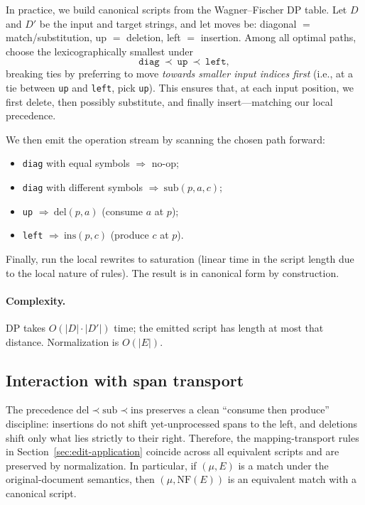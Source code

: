 \documentclass{article}
\begin{document}
In practice, we build canonical scripts from the Wagner–Fischer DP table.
Let $D$ and $D'$ be the input and target strings, and let moves be:
diagonal $=$ match/substitution, up $=$ deletion, left $=$ insertion.
Among all optimal paths, choose the lexicographically smallest under
\[
\texttt{diag} \ \prec\ \texttt{up} \ \prec\ \texttt{left},
\]
breaking ties by preferring to move \emph{towards smaller input indices first}
(i.e., at a tie between \texttt{up} and \texttt{left}, pick \texttt{up}).
This ensures that, at each input position, we first delete, then possibly substitute,
and finally insert---matching our local precedence.

We then emit the operation stream by scanning the chosen path forward:
\begin{itemize}
	\item \texttt{diag} with equal symbols $\Rightarrow$ no-op;
	\item \texttt{diag} with different symbols $\Rightarrow\ \mathrm{sub}(p,a,c)$;
	\item \texttt{up} $\Rightarrow\ \mathrm{del}(p,a)$ (consume $a$ at $p$);
	\item \texttt{left} $\Rightarrow\ \mathrm{ins}(p,c)$ (produce $c$ at $p$).
\end{itemize}
Finally, run the local rewrites to saturation (linear time in the script length due to the local nature of rules).
The result is in canonical form by construction.

\paragraph{Complexity.}
DP takes $O(|D|\cdot|D'|)$ time; the emitted script has length at most that distance.
Normalization is $O(|E|)$.

\subsection{Interaction with span transport}
The precedence $\mathrm{del}\prec\mathrm{sub}\prec\mathrm{ins}$ preserves a clean “consume then produce”
discipline: insertions do not shift yet-unprocessed spans to the left,
and deletions shift only what lies strictly to their right.
Therefore, the mapping-transport rules in Section~\ref{sec:edit-application}
coincide across all equivalent scripts and are preserved by normalization.
In particular, if $(\mu,E)$ is a match under the original-document semantics,
then $(\mu,\mathrm{NF}(E))$ is an equivalent match with a canonical script.
\end{document}
